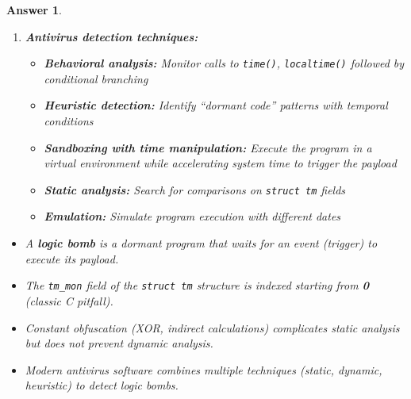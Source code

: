\documentclass[a4paper,11pt]{article}
\theoremstyle{plain}
\newtheorem{correction}{Answer}
\theoremstyle{definition}
\begin{document}
\begin{correction}
\begin{enumerate}
\item \textbf{Antivirus detection techniques:}

\begin{itemize}
\item \textbf{Behavioral analysis:} Monitor calls to \texttt{time()}, \texttt{localtime()} followed by conditional branching
\item \textbf{Heuristic detection:} Identify ``dormant code'' patterns with temporal conditions
\item \textbf{Sandboxing with time manipulation:} Execute the program in a virtual environment while accelerating system time to trigger the payload
\item \textbf{Static analysis:} Search for comparisons on \texttt{struct tm} fields
\item \textbf{Emulation:} Simulate program execution with different dates
\end{itemize}

\end{enumerate}

\begin{pointcle}
\begin{itemize}
    \item A \textbf{logic bomb} is a dormant program that waits for an event (\textit{trigger}) to execute its payload.
    \item The \texttt{tm\_mon} field of the \texttt{struct tm} structure is indexed starting from \textbf{0} (classic C pitfall).
    \item Constant obfuscation (XOR, indirect calculations) complicates static analysis but does not prevent dynamic analysis.
    \item Modern antivirus software combines multiple techniques (static, dynamic, heuristic) to detect logic bombs.
\end{itemize}
\end{pointcle}

\end{correction}

\bigskip

\end{document}
